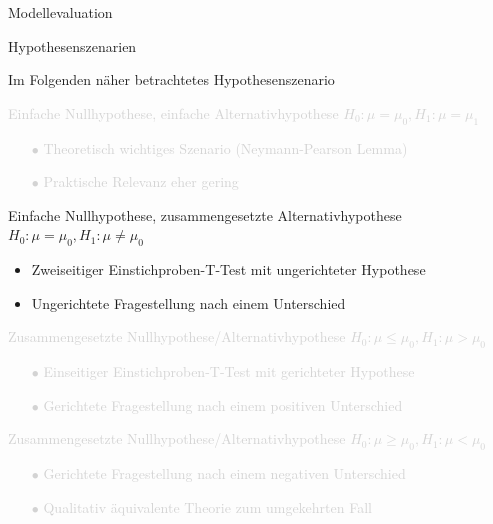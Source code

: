 \documentclass[
  8pt,
  ignorenonframetext,
]{beamer}
\begin{document}
\begin{frame}{Modellevaluation}
\protect\hypertarget{modellevaluation-2}{}
\small

Hypothesenszenarien

\small

Im Folgenden näher betrachtetes Hypothesenszenario


\textcolor{lightgray}{Einfache Nullhypothese, einfache Alternativhypothese $H_0:\mu = \mu_0, H_1:\mu = \mu_1$}

\begin{itemize}
\item[\textcolor{lightgray}{$\bullet$}] \textcolor{lightgray}{Theoretisch wichtiges Szenario (Neymann-Pearson Lemma)}
\item[\textcolor{lightgray}{$\bullet$}] \textcolor{lightgray}{Praktische Relevanz eher gering}
\end{itemize}

Einfache Nullhypothese, zusammengesetzte Alternativhypothese
\(H_0:\mu = \mu_0, H_1:\mu \neq \mu_0\)

\begin{itemize}
\item Zweiseitiger Einstichproben-T-Test mit ungerichteter Hypothese
\item Ungerichtete Fragestellung nach einem Unterschied
\end{itemize}

\textcolor{lightgray}{Zusammengesetzte Nullhypothese/Alternativhypothese $H_0:\mu \le \mu_0, H_1:\mu > \mu_0$}

\begin{itemize}
\item[\textcolor{lightgray}{$\bullet$}] \textcolor{lightgray}{Einseitiger Einstichproben-T-Test mit gerichteter Hypothese}
\item[\textcolor{lightgray}{$\bullet$}] \textcolor{lightgray}{Gerichtete Fragestellung nach einem positiven Unterschied}
\end{itemize}

\textcolor{lightgray}{Zusammengesetzte Nullhypothese/Alternativhypothese $H_0:\mu\ge\mu_0,H_1:\mu<\mu_0$}

\begin{itemize}
\item[\textcolor{lightgray}{$\bullet$}] \textcolor{lightgray}{Gerichtete Fragestellung nach einem negativen Unterschied}
\item[\textcolor{lightgray}{$\bullet$}] \textcolor{lightgray}{Qualitativ äquivalente Theorie zum umgekehrten Fall}
\end{itemize}
\end{frame}
\end{document}
